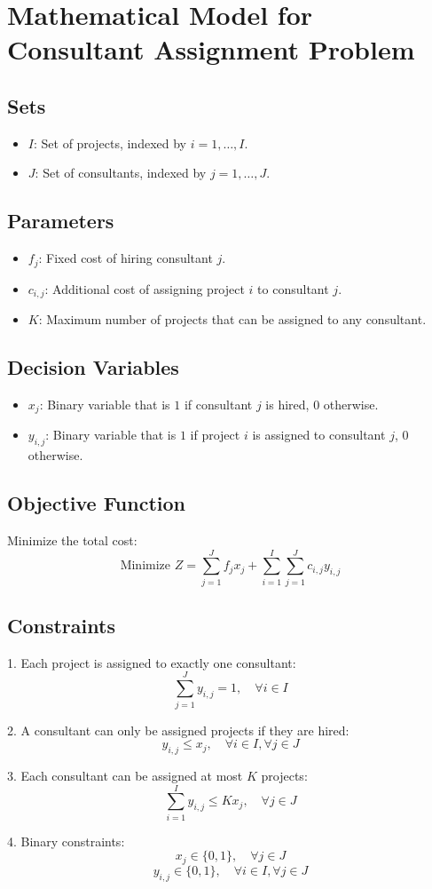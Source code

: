 \documentclass{article}
\begin{document}
\section*{Mathematical Model for Consultant Assignment Problem}

\subsection*{Sets}
\begin{itemize}
    \item $I$: Set of projects, indexed by $i = 1, \ldots, I$.
    \item $J$: Set of consultants, indexed by $j = 1, \ldots, J$.
\end{itemize}

\subsection*{Parameters}
\begin{itemize}
    \item $f_j$: Fixed cost of hiring consultant $j$.
    \item $c_{i,j}$: Additional cost of assigning project $i$ to consultant $j$.
    \item $K$: Maximum number of projects that can be assigned to any consultant.
\end{itemize}

\subsection*{Decision Variables}
\begin{itemize}
    \item $x_{j}$: Binary variable that is $1$ if consultant $j$ is hired, $0$ otherwise.
    \item $y_{i,j}$: Binary variable that is $1$ if project $i$ is assigned to consultant $j$, $0$ otherwise.
\end{itemize}

\subsection*{Objective Function}
Minimize the total cost:
\[
\text{Minimize } Z = \sum_{j=1}^{J} f_j x_j + \sum_{i=1}^{I} \sum_{j=1}^{J} c_{i,j} y_{i,j}
\]

\subsection*{Constraints}
1. Each project is assigned to exactly one consultant:
\[
\sum_{j=1}^{J} y_{i,j} = 1, \quad \forall i \in I
\]

2. A consultant can only be assigned projects if they are hired:
\[
y_{i,j} \leq x_j, \quad \forall i \in I, \forall j \in J
\]

3. Each consultant can be assigned at most $K$ projects:
\[
\sum_{i=1}^{I} y_{i,j} \leq K x_j, \quad \forall j \in J
\]

4. Binary constraints:
\[
x_j \in \{0, 1\}, \quad \forall j \in J
\]
\[
y_{i,j} \in \{0, 1\}, \quad \forall i \in I, \forall j \in J
\]
\end{document}
